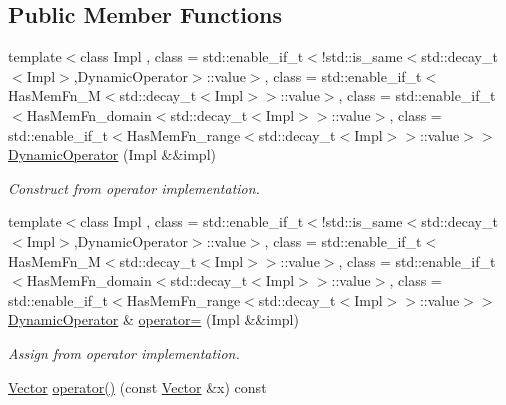 \subsection*{Public Member Functions}
\begin{DoxyCompactItemize}
\item 
\hypertarget{classSpacy_1_1DynamicOperator_a8aa0bb6c7e5dbe8961b62c7c76c0a119}{}{\footnotesize template$<$class Impl , class  = std\+::enable\+\_\+if\+\_\+t$<$!std\+::is\+\_\+same$<$std\+::decay\+\_\+t$<$\+Impl$>$,\+Dynamic\+Operator$>$\+::value$>$, class  = std\+::enable\+\_\+if\+\_\+t$<$\+Has\+Mem\+Fn\+\_\+\+M$<$std\+::decay\+\_\+t$<$\+Impl$>$$>$\+::value$>$, class  = std\+::enable\+\_\+if\+\_\+t$<$\+Has\+Mem\+Fn\+\_\+domain$<$std\+::decay\+\_\+t$<$\+Impl$>$$>$\+::value$>$, class  = std\+::enable\+\_\+if\+\_\+t$<$\+Has\+Mem\+Fn\+\_\+range$<$std\+::decay\+\_\+t$<$\+Impl$>$$>$\+::value$>$$>$ }\\\hyperlink{classSpacy_1_1DynamicOperator_a8aa0bb6c7e5dbe8961b62c7c76c0a119}{Dynamic\+Operator} (Impl \&\&impl)\label{classSpacy_1_1DynamicOperator_a8aa0bb6c7e5dbe8961b62c7c76c0a119}

\begin{DoxyCompactList}\small\item\em Construct from operator implementation. \end{DoxyCompactList}\item 
\hypertarget{classSpacy_1_1DynamicOperator_aa1c4fbbd723fd0656ff8e54e14f6ad0f}{}{\footnotesize template$<$class Impl , class  = std\+::enable\+\_\+if\+\_\+t$<$!std\+::is\+\_\+same$<$std\+::decay\+\_\+t$<$\+Impl$>$,\+Dynamic\+Operator$>$\+::value$>$, class  = std\+::enable\+\_\+if\+\_\+t$<$\+Has\+Mem\+Fn\+\_\+\+M$<$std\+::decay\+\_\+t$<$\+Impl$>$$>$\+::value$>$, class  = std\+::enable\+\_\+if\+\_\+t$<$\+Has\+Mem\+Fn\+\_\+domain$<$std\+::decay\+\_\+t$<$\+Impl$>$$>$\+::value$>$, class  = std\+::enable\+\_\+if\+\_\+t$<$\+Has\+Mem\+Fn\+\_\+range$<$std\+::decay\+\_\+t$<$\+Impl$>$$>$\+::value$>$$>$ }\\\hyperlink{classSpacy_1_1DynamicOperator}{Dynamic\+Operator} \& \hyperlink{classSpacy_1_1DynamicOperator_aa1c4fbbd723fd0656ff8e54e14f6ad0f}{operator=} (Impl \&\&impl)\label{classSpacy_1_1DynamicOperator_aa1c4fbbd723fd0656ff8e54e14f6ad0f}

\begin{DoxyCompactList}\small\item\em Assign from operator implementation. \end{DoxyCompactList}\item 
\hypertarget{classSpacy_1_1DynamicOperator_ace2c2202ca6eb3fe5f5817087d30510a}{}\hyperlink{classSpacy_1_1Vector}{Vector} \hyperlink{classSpacy_1_1DynamicOperator_ace2c2202ca6eb3fe5f5817087d30510a}{operator()} (const \hyperlink{classSpacy_1_1Vector}{Vector} \&x) const \label{classSpacy_1_1DynamicOperator_ace2c2202ca6eb3fe5f5817087d30510a}


\end{DoxyCompactItemize}
